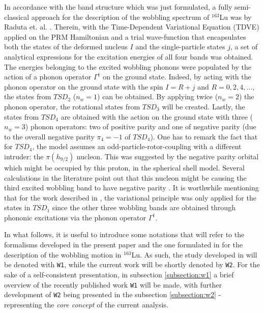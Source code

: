 \documentclass[myclassdoc,debug]{rjparticle}
\begin{document}
 In accordance with the band structure which was just formulated, a fully semi-classical approach for the description of the wobbling spectrum of $^{163}$Lu was by Raduta et. al. \cite{raduta2017semiclassical}. Therein, with the Time-Dependent Variational Equation (TDVE) applied on the PRM Hamiltonian and a trial wave-function that encapsulates both the states of the deformed nucleus $I$ and the single-particle states $j$, a set of analytical expressions for the excitation energies of all four bands was obtained. The energies belonging to the excited wobbling phonons were populated by the action of a phonon operator $\Gamma^\dagger$ on the ground state. Indeed, by acting with the phonon operator on the ground state with the spin $I=R+j$ and $R=0,2,4,\dots$, the states from $TSD_2$ ($n_w=1$) can be obtained. By applying twice ($n_w=2$) the phonon operator, the rotational states from $TSD_3$ will be created. Lastly, the states from $TSD_4$ are obtained with the action on the ground state with three ($n_w=3$) phonon operators: two of positive parity and one of negative parity (due to the overall negative parity $\pi_4=-1$ of $TSD_4$). One has to remark the fact that for $TSD_4$, the model assumes an odd-particle-rotor-coupling with a different intruder: the $\pi(h_{9/2})$ nucleon. This was suggested by the negative parity orbital which might be occupied by this proton, in the spherical shell model. Several calculations in the literature point out that this nucleon might be causing the third excited wobbling band to have negative parity \cite{jensen2004coexisting}. It is worthwhile mentioning that for the work described in \cite{raduta2017semiclassical}, the variational principle was only applied for the states in $TSD_1$ since the other three wobbling bands are obtained through phononic excitations via the phonon operator $\Gamma^\dagger$.

In what follows, it is useful to introduce some notations that will refer to the formalisms developed in the present paper and the one formulated in \cite{raduta2020towards} for the description of the wobbling motion in $^{163}$Lu. As such, the study developed in \cite{raduta2020towards} will be denoted with \texttt{W1}, while the current work will be shortly denoted by \texttt{W2}. For the sake of a self-consistent presentation, in subsection \ref{subsection:w1} a brief overview of the recently published work \texttt{W1} will be made, with further development of \texttt{W2} being presented in the subsection \ref{subsection:w2} - representing the \emph{core concept} of the current analysis.
\end{document}

